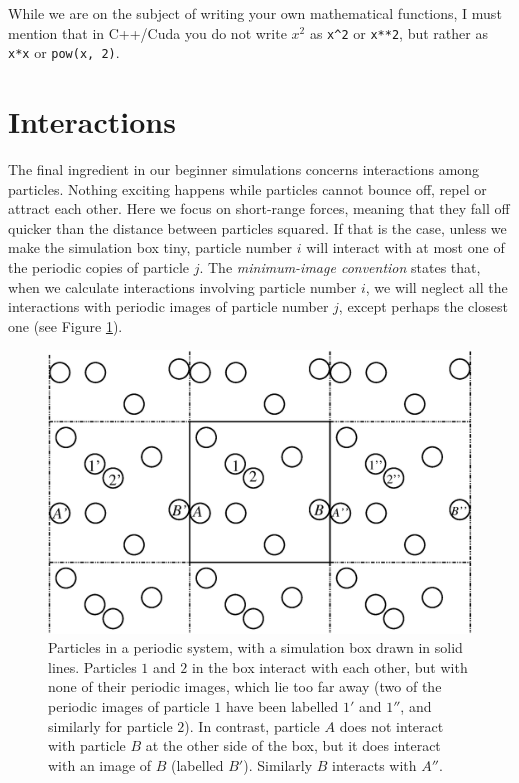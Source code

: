 While we are on the subject of writing your own mathematical functions, I must 
mention that in C++/Cuda you do not write $x^2$ as \texttt{x{\textasciicircum}2} 
or \texttt{x**2}, but rather as \texttt{x*x} or \texttt{pow(x, 2)}.

\section{Interactions}

The final ingredient in our beginner simulations concerns interactions among 
particles. Nothing exciting happens while particles cannot bounce off, repel or 
attract each other. Here we focus on short-range forces, meaning that they fall 
off quicker than the distance between particles squared. If that is the case, 
unless we make the simulation box tiny, particle number $i$ will interact with 
at most one of the periodic copies of particle $j$. The \textit{minimum-image 
convention} states that, when we calculate interactions involving particle 
number $i$, we will neglect all the interactions with periodic images of 
particle number $j$, except perhaps the closest one (see Figure 
\ref{minimum-image_convention}).

\begin{figure}
  \centering
  \includegraphics[width = \textwidth]{figures/minimum-image_convention.eps}
  \caption{\label{minimum-image_convention}Particles in a periodic system, with
           a simulation box drawn in solid lines. Particles $1$ and $2$ in the
           box interact with each other, but with none of their periodic images,
           which lie too far away (two of the periodic images of particle $1$
           have been labelled $1'$ and $1''$, and similarly for particle $2$).
           In contrast, particle $A$ does not interact with particle $B$ at the
           other side of the box, but it does interact with an image of $B$
           (labelled $B'$). Similarly $B$ interacts with $A''$.}
\end{figure}

